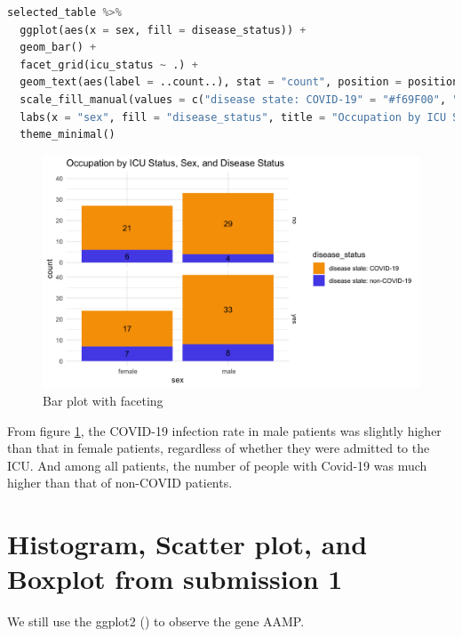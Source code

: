 \documentclass[a4paper, 12pt, one column]{article}
\begin{document}
\begin{lstlisting}[language=Python]
selected_table %>%
  ggplot(aes(x = sex, fill = disease_status)) +
  geom_bar() +
  facet_grid(icu_status ~ .) +
  geom_text(aes(label = ..count..), stat = "count", position = position_stack(vjust = 0.5)) +
  scale_fill_manual(values = c("disease state: COVID-19" = "#f69F00", "disease state: non-COVID-19" = "#5654E9")) +
  labs(x = "sex", fill = "disease_status", title = "Occupation by ICU Status, Sex, and Disease Status") +
  theme_minimal()
\end{lstlisting}

\begin{figure}[H]
    \centering
    \includegraphics[width=1\textwidth]{new_map.png} 
    \caption{Bar plot with faceting}
    \label{faceting}
\end{figure}
From figure \ref{faceting}, the COVID-19 infection rate in male patients was slightly higher than that in female patients, regardless of whether they were admitted to the ICU. And among all patients, the number of people with Covid-19 was much higher than that of non-COVID patients.

\section{Histogram, Scatter plot, and Boxplot from submission 1}
We still use the ggplot2 (\cite{ggplot2_2024}) to observe the gene AAMP.
\end{document}
